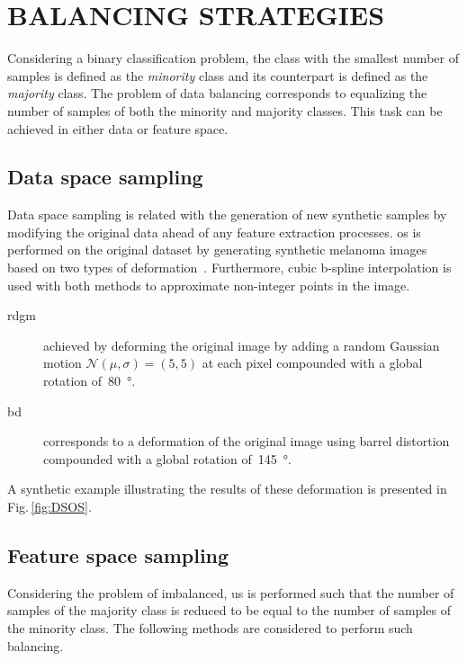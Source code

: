 \graphicspath{ {./content/method/figures/} }

\section{\uppercase{Balancing strategies}}\label{sec:met}

\noindent Considering a binary classification problem, the class with the smallest number of samples is defined as the \textit{minority} class and its counterpart is defined as the \textit{majority} class.
The problem of data balancing corresponds to equalizing the number of samples of both the minority and majority classes. This task can be achieved in either data or feature space.

\subsection{Data space sampling}

Data space sampling is related with the generation of new synthetic samples by modifying the original data ahead of any feature extraction processes.
\Ac{os} is performed on the original dataset by generating synthetic melanoma images based on two types of deformation~\cite{rastgoo2015ensemble}. Furthermore, cubic b-spline interpolation is used with both methods to approximate non-integer points in the image.
 
\begin{description}
	\item[\Ac{rdgm}] achieved by deforming the original image by adding a random Gaussian motion $\mathcal{N}(\mu, \sigma) = (5,5)$ at each pixel compounded with a global rotation of~\SI{80}{\degree}.
	\item[\Ac{bd}] corresponds to a deformation of the original image using barrel distortion compounded with a global rotation of~\SI{145}{\degree}.
\end{description}

A synthetic example illustrating the results of these deformation is presented in Fig.\,\ref{fig:DSOS}.

\subsection{Feature space sampling}

Considering the problem of imbalanced, \ac{us} is performed such that the number of samples of the majority class is reduced to be equal to the number of samples of the minority class.
The following methods are considered to perform such balancing.

